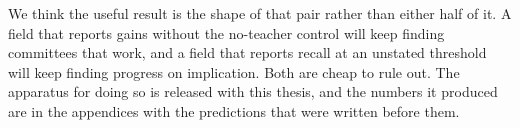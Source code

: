 We think the useful result is the shape of that pair rather than either half of it. A field that
reports gains without the no-teacher control will keep finding committees that work, and a field that
reports recall at an unstated threshold will keep finding progress on implication. Both are cheap to
rule out. The apparatus for doing so is released with this thesis, and the numbers it produced are in
the appendices with the predictions that were written before them.
